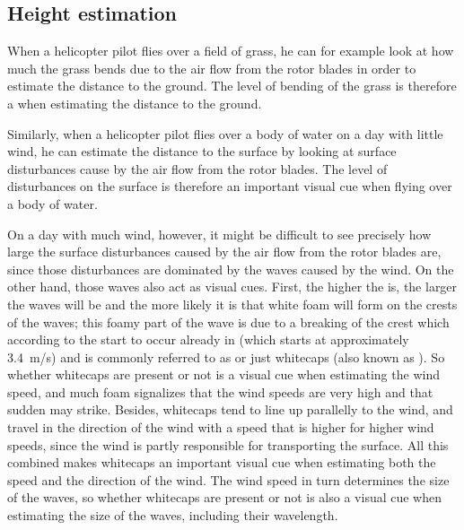 \subsection{Height estimation}

When a helicopter pilot flies over a field of grass, he can for example look at how much the grass bends due to the air flow from the rotor blades in order to estimate the distance to the ground. The level of bending of the grass is therefore a  when estimating the distance to the ground.

Similarly, when a helicopter pilot flies over a body of water on a day with little wind, he can estimate the distance to the surface by looking at surface disturbances cause by the air flow from the rotor blades. The level of disturbances on the surface is therefore an important visual cue when flying over a body of water.


On a day with much wind, however, it might be difficult to see precisely how large the surface disturbances caused by the air flow from the rotor blades are, since those disturbances are dominated by the waves caused by the wind. On the other hand, those waves also act as visual cues. First, the higher the  is, the larger the waves will be and the more likely it is that white foam will form on the crests of the waves; this foamy part of the wave is due to a breaking of the crest which according to the  start to occur already in  (which starts at approximately 3.4~m/s) and is commonly referred to as  or just whitecaps (also known as ). So whether whitecaps are present or not is a visual cue when estimating the wind speed, and much foam signalizes that the wind speeds are very high and that sudden \gusts may strike. Besides, whitecaps tend to line up parallelly to the wind, and travel in the direction of the wind with a speed that is higher for higher wind speeds, since the wind is partly responsible for transporting the surface. All this combined makes whitecaps an important visual cue when estimating both the speed and the direction of the wind. The wind speed in turn determines the size of the waves, so whether whitecaps are present or not is also a visual cue when estimating the size of the waves, including their wavelength.

